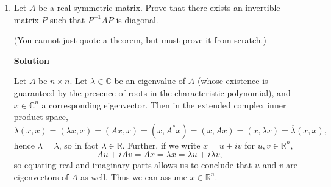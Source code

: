 \documentclass{article}
\newcommand{\matrixiiibyiii}[9]{\left( \begin{array}{ccc} #1 & #2 & #3 \\ #4 & #5 & #6 \\ #7 & #8 & #9 \end{array} \right)}
\begin{document}
\begin{enumerate}
{\bf Solution}

Let
\[B_T = \matrixiiibyiii{\frac{1}{\sqrt{3}}}{ \frac{1}{\sqrt{2}}}{ \frac{1}{\sqrt{6}}}
                       {\frac{1}{\sqrt{3}}}{-\frac{1}{\sqrt{2}}}{ \frac{1}{\sqrt{6}}}
                       {\frac{1}{\sqrt{3}}}{                  0}{-\frac{2}{\sqrt{6}}}.\]
Then regarding the columns of \(B_T\) as an orthonormal basis, the matrix representation of \(T\) in this basis is
\[[T]_{B_T} = \matrixiiibyiii{1}{               0}{              0}
                             {0}{ \cos 60^{\circ}}{\sin 60^{\circ}}
                             {0}{-\sin 60^{\circ}}{\cos 60^{\circ}},\]
so the matrix representation of \(T\) in the standard basis is
\[T = B_T [T]_{B_T} B_T^{-1}
    = B_T [T]_{B_T} B_T^t.\]
Let
\[B_S = \matrixiiibyiii{\frac{1}{\sqrt{2}}}{0}{ \frac{1}{\sqrt{2}}}
                       {                 0}{1}{                  0}
                       {\frac{1}{\sqrt{2}}}{0}{-\frac{1}{\sqrt{2}}}.\]
Then regarding the columns of \(B_S\) as an orthonormal basis, the matrix representation of \(S\) in this basis is
\[[S]_{B_S} = \matrixiiibyiii{-1}{0}{0}
                             { 0}{1}{0}
                             { 0}{0}{1},\]
so the matrix representation of \(S\) in the standard basis is
\[S = B_S [S]_{B_S} B_S^{-1}
    = B_S [S]_{B_S} B_S^t,\]
and it follows that
\[S \circ T = B_S [S]_{B_S} B_S^t B_T [T]_{B_T} B_T^t.\]



\item Let \(A\) be a real symmetric matrix.  Prove that there exists an invertible matrix \(P\) such that \(P^{-1}AP\) is diagonal.

(You cannot just quote a theorem, but must prove it from scratch.)

{\bf Solution}

Let \(A\) be \(n \times n\).  Let \(\lambda \in \mathbb{C}\) be an eigenvalue of \(A\) (whose existence is guaranteed by the presence of roots in the characteristic polynomial), and \(x \in \mathbb{C}^n\) a corresponding eigenvector.  Then in the extended complex inner product space,
\[\lambda (x, x) = (\lambda x, x) = (Ax, x) = (x, A^*x) = (x, Ax) = (x, \lambda x) = \overline{\lambda} (x, x),\]
hence \(\lambda = \overline{\lambda}\), so in fact \(\lambda \in \mathbb{R}\).  Further, if we write \(x = u + iv\) for \(u,v \in \mathbb{R}^n\),
\[Au + i Av = Ax = \lambda x = \lambda u + i \lambda v,\]
so equating real and imaginary parts allows us to conclude that \(u\) and \(v\) are eigenvectors of \(A\) as well.  Thus we can assume \(x \in \mathbb{R}^n\).


\end{enumerate}
\end{document}
